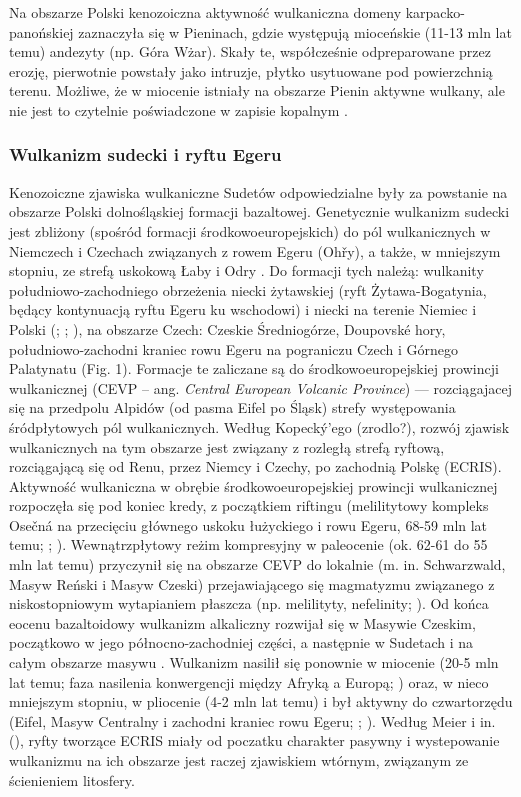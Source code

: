 \documentclass[11.5pt,twoside]{report}
\begin{document}
 Na obszarze Polski kenozoiczna aktywność wulkaniczna domeny karpacko-panońskiej zaznaczyła się w Pieninach, gdzie występują mioceńskie (11-13 mln lat temu) andezyty (np. Góra Wżar). Skały te, współcześnie odpreparowane przez erozję, pierwotnie powstały jako intruzje, płytko usytuowane pod powierzchnią terenu. Możliwe, że w miocenie istniały na obszarze Pienin aktywne wulkany, ale nie jest to czytelnie poświadczone w zapisie kopalnym \parencite{Krzeminska.2011}.
 
 \subsubsection{Wulkanizm sudecki i ryftu Egeru}
 
 Kenozoiczne zjawiska wulkaniczne Sudetów odpowiedzialne były za powstanie na obszarze Polski dolnośląskiej formacji bazaltowej. Genetycznie wulkanizm sudecki jest zbliżony (spośród formacji środkowoeuropejskich) do pól wulkanicznych w Niemczech i Czechach związanych z rowem Egeru (Oh\v{r}y), a także, w mniejszym stopniu, ze strefą uskokową Łaby i Odry \parencite{Puziewicz.2011}. Do formacji tych należą: wulkanity południowo-zachodniego obrzeżenia niecki żytawskiej (ryft Żytawa-Bogatynia, będący kontynuacją ryftu Egeru ku wschodowi) i niecki  na terenie Niemiec i Polski (\cite{Buchner.2015}; \cite{Szymkowiak.1985}; \cite{Panasiuk.1980}), na obszarze Czech: Czeskie Średniogórze, Doupovské hory, południowo-zachodni kraniec rowu Egeru na pograniczu Czech i Górnego Palatynatu (Fig. 1). Formacje te zaliczane są do środkowoeuropejskiej prowincji wulkanicznej (CEVP -- ang. \textit{Central European Volcanic Province}) --- rozciągajacej się na przedpolu Alpidów (od pasma Eifel po Śląsk) strefy występowania śródpłytowych pól wulkanicznych. Według Kopeck\'{y}'ego (zrodlo?), rozwój zjawisk wulkanicznych na tym obszarze jest związany z rozległą strefą ryftową, rozciągającą się od Renu, przez Niemcy i Czechy, po zachodnią Polskę (ECRIS). Aktywność wulkaniczna w obrębie środkowoeuropejskiej prowincji wulkanicznej rozpoczęła się pod koniec kredy, z początkiem riftingu (melilitytowy kompleks Osečná na przecięciu głównego uskoku łużyckiego i rowu Egeru, 68-59 mln lat temu; \cite{Ulrych.2008}; \cite{Ulrych.2000}). Wewnątrzpłytowy reżim kompresyjny w paleocenie (ok. 62-61 do 55 mln lat temu) przyczynił się na obszarze CEVP do lokalnie (m. in. Schwarzwald, Masyw Reński i Masyw Czeski) przejawiającego się magmatyzmu związanego z niskostopniowym wytapianiem płaszcza (np. melilityty, nefelinity; \cite{Wilson.2006}). Od końca eocenu bazaltoidowy wulkanizm alkaliczny rozwijał się w Masywie Czeskim, początkowo w jego północno-zachodniej części, a następnie w Sudetach i na całym obszarze masywu \parencite{Sobczyk.2015}. Wulkanizm nasilił się ponownie w miocenie (20-5 mln lat temu; faza nasilenia konwergencji między Afryką a Europą; \cite{Wilson.2006}) oraz, w nieco mniejszym stopniu, w pliocenie (4-2 mln lat temu) i był aktywny do czwartorzędu (Eifel, Masyw Centralny i zachodni kraniec rowu Egeru; \cite{Meier.2016}; \cite{Wilson.2006}). Według Meier i in. (\citeyear{Meier.2016}), ryfty tworzące ECRIS miały od poczatku charakter pasywny i wystepowanie wulkanizmu na ich obszarze jest raczej zjawiskiem wtórnym, związanym ze ścienieniem litosfery. 
\end{document}
